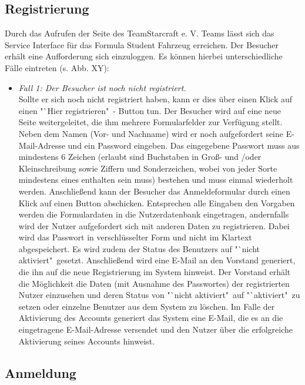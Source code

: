 \documentclass[fontsize = 12pt, paper = a4]{scrreprt}
\begin{document}
\newpage

\subsection{Registrierung}

Durch das Aufrufen der Seite des TeamStarcraft e. V. Teams lässt sich das Service Interface für das Formula Student Fahrzeug erreichen. Der Besucher erhält eine Aufforderung sich einzuloggen. Es können hierbei unterschiedliche Fälle eintreten (s. Abb. XY): 

\begin{itemize}

\item \textit{Fall 1: Der Besucher ist noch nicht registriert.} \\
Sollte er sich noch nicht registriert haben, kann er dies über einen Klick auf einen "`Hier registrieren"\ - Button tun. Der Besucher wird auf eine neue Seite weitergeleitet, die ihm mehrere Formularfelder zur Verfügung stellt. Neben dem Namen (Vor- und Nachname) wird er noch aufgefordert seine E-Mail-Adresse und ein Password eingeben. Das eingegebene Passwort muss aus mindestens 6 Zeichen (erlaubt sind Buchstaben in Groß- und /oder Kleinschreibung sowie Ziffern und Sonderzeichen, wobei von jeder Sorte mindestens eines enthalten sein muss) bestehen und muss einmal wiederholt werden. Anschließend kann der Besucher das Anmeldeformular durch einen Klick auf einen Button abschicken. Entsprechen alle Eingaben den Vorgaben werden die Formulardaten in die Nutzerdatenbank eingetragen, andernfalls wird der Nutzer aufgefordert sich mit anderen Daten zu registrieren. Dabei wird das Passwort in verschlüsselter Form und nicht im Klartext abgespeichert. Es wird zudem der Status des Benutzers auf "`nicht aktiviert"\ gesetzt. Anschließend wird eine E-Mail an den Vorstand generiert, die ihn auf die neue Registrierung im System hinweist. Der Vorstand erhält die Möglichkeit die Daten (mit Ausnahme des Passwortes) der registrierten Nutzer einzusehen und deren Status von "`nicht aktiviert"\ auf "`aktiviert"\ zu setzen oder einzelne Benutzer aus dem System zu löschen. Im Falle der Aktivierung des Accounts generiert das System eine E-Mail, die es an die eingetragene E-Mail-Adresse versendet und den Nutzer über die erfolgreiche Aktivierung seines Accounts hinweist.

\end{itemize}

\subsection{Anmeldung}
\end{document}
